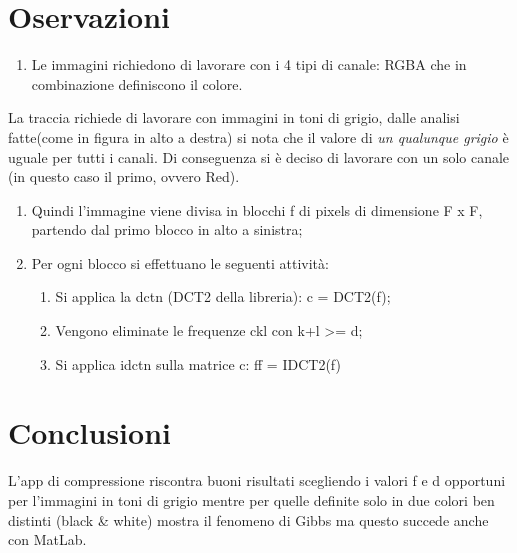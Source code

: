 \documentclass[12pt]{article}
\begin{document}
\section{Oservazioni}
	\begin{enumerate}
		\item Le immagini richiedono di lavorare con i 4 tipi di canale: RGBA che in combinazione definiscono il colore.
	\end{enumerate}
	La traccia richiede di lavorare con immagini in toni di grigio, dalle analisi fatte(come in figura in alto a destra) si nota che il valore di \textit{un qualunque grigio} è uguale per tutti i canali.\newline
Di conseguenza si è deciso di lavorare con un solo canale (in questo caso il primo, ovvero Red).
	\begin{enumerate}
		\item Quindi l’immagine viene divisa in blocchi f di pixels di dimensione F x F, partendo dal primo blocco in alto a sinistra;
		\item Per ogni blocco si effettuano le seguenti attività:
		\begin{enumerate}[label=\Alph*]
			\item Si applica la dctn (DCT2 della libreria): c = DCT2(f);
			\item Vengono eliminate le frequenze ckl con k+l >= d;
			\item Si applica idctn sulla matrice c: ff = IDCT2(f)
		\end{enumerate}
	\end{enumerate}
\section{Conclusioni}
L’app di compressione riscontra buoni risultati scegliendo i valori f e d opportuni per l’immagini in toni di grigio mentre per quelle definite solo in due colori ben distinti (black \& white) mostra il fenomeno di Gibbs ma questo succede anche con MatLab.
\end{document}
